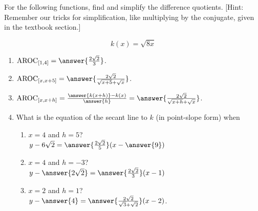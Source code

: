 \documentclass{ximera}
\author{Elizabeth Campolongo}
\begin{document}
\begin{exercise}

For the following functions, 
find and simplify the difference quotients. [Hint: Remember our tricks for simplification, like multiplying by the conjugate, given in the textbook section.]

 $$k(x)= \sqrt{8x}$$

\begin{enumerate}

\item $\av_{[1,4]} = \answer{\frac{2\sqrt{2}}{3}}$.

\item $\av_{[x,x+5]} =  \answer{\frac{2\sqrt{2}}{\sqrt{x+5} + \sqrt{x}}}$.

\item $\av_{[x,x+h]} = \frac{\answer{k(x+h)}-k(x)}{\answer{h}}   = \answer{\frac{2\sqrt{2}}{\sqrt{x+h} + \sqrt{x}}}$.  

\item What is the equation of the secant line to $k$ (in point-slope form) when
\begin{enumerate}
\item $x = 4$ and $h=5$? \\
$y-6\sqrt{2} = \answer{\frac{2\sqrt{2}}{5}}(x-\answer{9})$

\item $x = 4$ and $h = -3$? \\
$y - \answer{2\sqrt{2}} = \answer{\frac{2\sqrt{2}}{3}}(x-1)$

\item $x = 2$ and $h= 1$? \\
$y - \answer{4} = \answer{\frac{2\sqrt{2}}{\sqrt{3} + \sqrt{2}}}(x-2)$.
\end{enumerate}

	
\end{enumerate}
\end{exercise}
\end{document}
